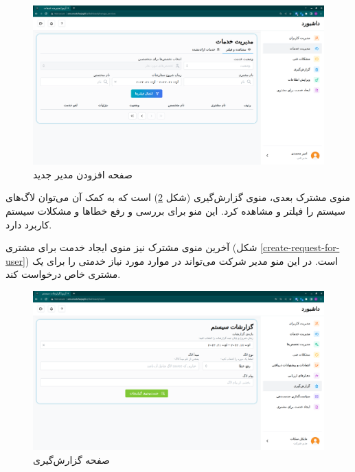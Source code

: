 \begin{figure}[h]
	\centering
	\includegraphics[width=\textwidth]{figs/user-guide/tm-manage-requests}
	\caption{صفحه افزودن مدیر جدید}
	\label{manage-requests}
\end{figure}

\FloatBarrier

منوی مشترک بعدی، منوی گزارش‌گیری (شکل \ref{system-report}) است که به کمک آن می‌توان لاگ‌های سیستم را فیلتر و مشاهده کرد.
این منو برای بررسی و رفع خطاها و مشکلات سیستم کاربرد دارد.

آخرین منوی مشترک نیز منوی ایجاد خدمت برای مشتری (شکل \ref{create-request-for-user}) است.
در این منو مدیر شرکت می‌تواند در موارد مورد نیاز خدمتی را برای یک مشتری خاص درخواست کند.

\begin{figure}[h]
	\centering
	\includegraphics[width=\textwidth]{figs/user-guide/cm-report}
	\caption{صفحه گزارش‌گیری}
	\label{system-report}
\end{figure}

